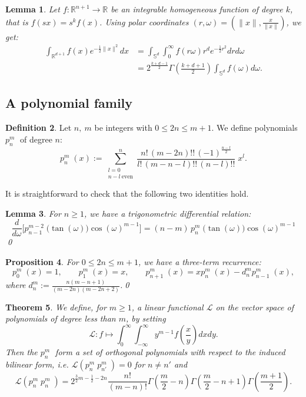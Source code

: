 \documentclass{amsart}
\newcommand{\ie}{{\it i.e. }}
\newcommand{\p}[2]{p_{#1}^{#2}\;\!\!}
\renewcommand{\L}{\mathcal{L}}
\newcommand{\coloneqq}{:=}
\newcommand{\R}{\mathbb{R}}
\renewcommand{\S}{\mathbb{S}}
\theoremstyle{plain}
\newtheorem{theorem}{Theorem}[section]
\newtheorem{lemma}[theorem]{Lemma}
\newtheorem{proposition}[theorem]{Proposition}
\theoremstyle{definition}
\newtheorem{definition}[theorem]{Definition}
\theoremstyle{remark}
\begin{document}
\begin{lemma}\label{homosphere}
Let $f:\R^{n+1}\rightarrow\R$ be an integrable homogeneous function of degree $k$, that is $f(sx) = s^kf(x)$. Using polar coordinates $(r,\omega) = (\|x\|,\frac{x}{\|x\|})$, we get:
\begin{align*}
\int_{\R^{d+1}}f(x)e^{-\frac{1}{2}\|x\|^2} dx &= \int_{\S^d}\!\int_0^\infty\! f(r\omega) r^d e^{-\frac{1}{2}r^2}dr d\omega \\
&= 2^{\frac{k+d-1}{2}}\Gamma\left(\tfrac{k+d+1}{2}\right)\int_{\S^d}f(\omega)d\omega .
\end{align*}
\end{lemma}


\subsection{A polynomial family}
\begin{definition} Let $n,\ m$ be integers with $0\leq 2n\leq m+1$. We define polynomials $\p{n}{m}$ of degree $n$:
\begin{equation}
\p{n}{m}(x) \coloneqq \sum_{\substack{l=0\\ n-l\ \text{even}}}^n \frac{n!\,(m-2n)!!\,(-1)^{\frac{n-l}{2}}}{l!\,(m-n-l)!!\,(n-l)!!}\;x^l.
\end{equation}
\end{definition}
It is straightforward to check that the following two identities hold.
\begin{lemma} \label{trigonometric}
For $n\geq 1$, we have a trigonometric differential relation:
\begin{equation}
\frac{d}{d\omega} \Big[\p{n-1}{m-2}\big(\tan(\omega)\big)\cos(\omega)^{m-1} \Big]= (n-m)\, \p{n}{m}\big(\tan(\omega)\big)\cos(\omega)^{m-1}
\end{equation} \qed
\end{lemma}
\begin{proposition} \label{threeterm} For $0\leq 2n\leq m+1$, we have a three-term recurrence:
\begin{equation}
\p{0}{m}(x) = 1,\qquad \p{1}{m}(x) = x, \qquad \p{n+1}{m}(x) = x\p{n}{m}(x) -d_n^m \p{n-1}{m}(x),
\end{equation} 
where $d_n^m\coloneqq \frac{n(m-n+1)}{(m-2n)(m-2n+2)}$.\qed
\end{proposition}
\begin{theorem} We define, for $m\geq 1$, a linear functional $\L$ on the vector space of polynomials of degree less than $m$, by setting
\begin{equation}
\L: f \longmapsto \int_0^\infty\!\!\! \int_{-\infty}^\infty y^{m-1}f\left(\frac{x}{y}\right)dxdy.
\end{equation}
Then the $\p{n}{m}$ form a set of orthogonal polynomials with respect to the induced bilinear form, \ie $\L(\p{n}{m}\p{n'}{m})=0$ for $n\neq n'$ and 
\begin{equation}
\L(\p{n}{m}\p{n}{m}) = 2^{\frac{3}{2}m-\frac{1}{2}-2n}  \frac{n!}{(m-n)!}
\Gamma\left(\frac{m}{2}-n\right)\Gamma\left(\frac{m}{2}-n+1\right)\Gamma\left(\frac{m+1}{2}\right).
\end{equation}
\end{theorem}
\end{document}
